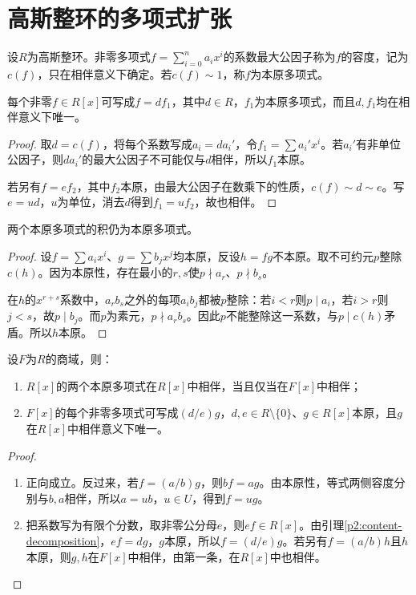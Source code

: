 \section{高斯整环的多项式扩张}

\begin{definition}
设$R$为高斯整环。非零多项式$f=\sum_{i=0}^na_ix^i$的系数最大公因子称为$f$的容度，记为$c(f)$，只在相伴意义下确定。若$c(f)\sim1$，称$f$为本原多项式。
\end{definition}

\begin{lemma}\label{p2:content-decomposition}
每个非零$f\in R[x]$可写成$f=df_1$，其中$d\in R$，$f_1$为本原多项式，而且$d,f_1$均在相伴意义下唯一。
\end{lemma}
\begin{proof}
取$d=c(f)$，将每个系数写成$a_i=da_i'$，令$f_1=\sum a_i'x^i$。若$a_i'$有非单位公因子，则$da_i'$的最大公因子不可能仅与$d$相伴，所以$f_1$本原。

若另有$f=ef_2$，其中$f_2$本原，由最大公因子在数乘下的性质，$c(f)\sim d\sim e$。写$e=ud$，$u$为单位，消去$d$得到$f_1=uf_2$，故也相伴。
\end{proof}

\begin{lemma}[高斯引理]\label{p2:gauss-primitive}
两个本原多项式的积仍为本原多项式。
\end{lemma}
\begin{proof}
设$f=\sum a_ix^i$、$g=\sum b_jx^j$均本原，反设$h=fg$不本原。取不可约元$p$整除$c(h)$。因为本原性，存在最小的$r,s$使$p\nmid a_r$、$p\nmid b_s$。

在$h$的$x^{r+s}$系数中，$a_rb_s$之外的每项$a_ib_j$都被$p$整除：若$i<r$则$p\mid a_i$，若$i>r$则$j<s$，故$p\mid b_j$。而$p$为素元，$p\nmid a_rb_s$。因此$p$不能整除这一系数，与$p\mid c(h)$矛盾。所以$h$本原。
\end{proof}

\begin{lemma}\label{p2:primitive-fraction-field}
设$F$为$R$的商域，则：
\begin{enumerate}
\item $R[x]$的两个本原多项式在$R[x]$中相伴，当且仅当在$F[x]$中相伴；
\item $F[x]$的每个非零多项式可写成$(d/e)g$，$d,e\in R\setminus\{0\}$、$g\in R[x]$本原，且$g$在$R[x]$中相伴意义下唯一。
\end{enumerate}
\end{lemma}
\begin{proof}
\begin{enumerate}
\item 正向成立。反过来，若$f=(a/b)g$，则$bf=ag$。由本原性，等式两侧容度分别与$b,a$相伴，所以$a=ub$，$u\in U$，得到$f=ug$。
\item 把系数写为有限个分数，取非零公分母$e$，则$ef\in R[x]$。由引理\ref{p2:content-decomposition}，$ef=dg$，$g$本原，所以$f=(d/e)g$。若另有$f=(a/b)h$且$h$本原，则$g,h$在$F[x]$中相伴，由第一条，在$R[x]$中也相伴。
\end{enumerate}
\end{proof}

